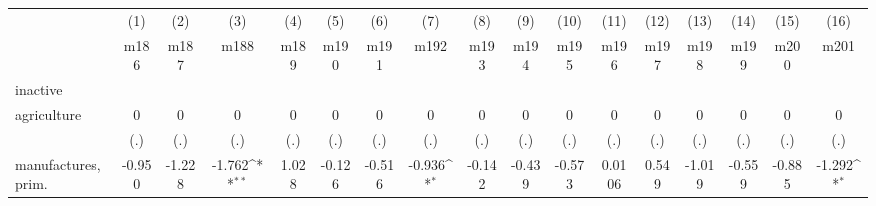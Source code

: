 {
\def\sym#1{\ifmmode^{#1}\else\(^{#1}\)\fi}
\begin{tabular}{l*{16}{c}}
\hline\hline
                    &\multicolumn{1}{c}{(1)}&\multicolumn{1}{c}{(2)}&\multicolumn{1}{c}{(3)}&\multicolumn{1}{c}{(4)}&\multicolumn{1}{c}{(5)}&\multicolumn{1}{c}{(6)}&\multicolumn{1}{c}{(7)}&\multicolumn{1}{c}{(8)}&\multicolumn{1}{c}{(9)}&\multicolumn{1}{c}{(10)}&\multicolumn{1}{c}{(11)}&\multicolumn{1}{c}{(12)}&\multicolumn{1}{c}{(13)}&\multicolumn{1}{c}{(14)}&\multicolumn{1}{c}{(15)}&\multicolumn{1}{c}{(16)}\\
                    &\multicolumn{1}{c}{m186}&\multicolumn{1}{c}{m187}&\multicolumn{1}{c}{m188}&\multicolumn{1}{c}{m189}&\multicolumn{1}{c}{m190}&\multicolumn{1}{c}{m191}&\multicolumn{1}{c}{m192}&\multicolumn{1}{c}{m193}&\multicolumn{1}{c}{m194}&\multicolumn{1}{c}{m195}&\multicolumn{1}{c}{m196}&\multicolumn{1}{c}{m197}&\multicolumn{1}{c}{m198}&\multicolumn{1}{c}{m199}&\multicolumn{1}{c}{m200}&\multicolumn{1}{c}{m201}\\
\hline
inactive            &                     &                     &                     &                     &                     &                     &                     &                     &                     &                     &                     &                     &                     &                     &                     &                     \\
agriculture         &           0         &           0         &           0         &           0         &           0         &           0         &           0         &           0         &           0         &           0         &           0         &           0         &           0         &           0         &           0         &           0         \\
                    &         (.)         &         (.)         &         (.)         &         (.)         &         (.)         &         (.)         &         (.)         &         (.)         &         (.)         &         (.)         &         (.)         &         (.)         &         (.)         &         (.)         &         (.)         &         (.)         \\
[1em]
manufactures, prim. &      -0.950         &      -1.228         &      -1.762\sym{**} &       1.028         &      -0.126         &      -0.516         &      -0.936\sym{*}  &      -0.142         &      -0.439         &      -0.573         &      0.0106         &       0.549         &      -1.019         &      -0.559         &      -0.885         &      -1.292\sym{*}  \\

\end{tabular}}
